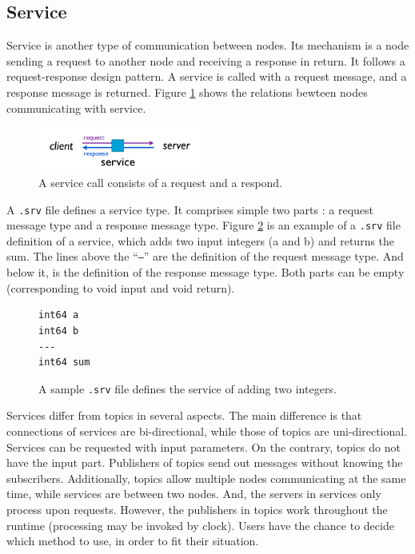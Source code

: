 \documentclass[a4paper, 10pt, conference]{ieeeconf}       %
\begin{document}
\subsection{Service}

Service is another type of communication between nodes. Its mechanism is a node sending a request to another node and receiving a response in return. It follows a request-response design pattern. A service is called with a request message, and a response message is returned. Figure \ref{fig:service} shows the relations bewteen nodes communicating with service.

\begin{figure}[htpb]
  \centering
  \includegraphics[width=0.48\textwidth]{service}
  \caption{A service call consists of a request and a respond.}
  \label{fig:service}
\end{figure}

A \texttt{.srv} file defines a service type. It comprises simple two parts : a request message type and a response message type. Figure \ref{fig:srvfile} is an example of a \texttt{.srv} file definition of a service, which adds two input integers (a and b) and returns the sum. The lines above the ``\texttt{---}'' are the definition of the request message type. And below it, is the definition of the response message type. Both parts can be empty (corresponding to void input and void return).

\begin{figure}[htpb]
  \centering
\begin{Verbatim}[frame=single]
int64 a
int64 b
---
int64 sum
\end{Verbatim}
  \caption{A sample \texttt{.srv} file defines the service of adding two integers.}
  \label{fig:srvfile}
\end{figure}

  Services differ from topics in several aspects. The main difference is that connections of services are bi-directional, while those of topics are uni-directional. Services can be requested with input parameters. On the contrary, topics do not have the input part. Publishers of topics send out messages without knowing the subscribers. Additionally, topics allow multiple nodes communicating at the same time, while services are between two nodes. And, the servers in services only process upon requests. However, the publishers in topics work throughout the runtime (processing may be invoked by clock). Users have the chance to decide which method to use, in order to fit their situation.
\end{document}
